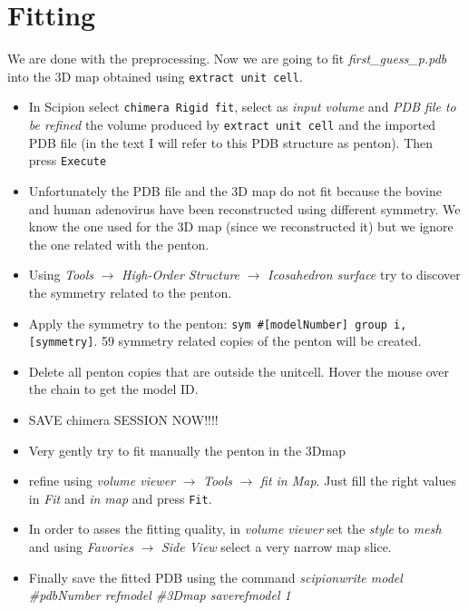 \documentclass[12pt]{article} %
\newcommand{\ttt}[1]{\texttt{#1}}
\begin{document}
\section{Fitting}
We are done with the preprocessing. Now we are going to fit \textit{first\_guess\_p.pdb} into the 3D map obtained using \ttt{extract unit cell}. 

\begin{itemize}
\item In Scipion select \ttt{chimera Rigid fit}, select as \textit{input volume} and \textit{PDB file to be refined} the volume produced by \ttt{extract unit cell} and the imported PDB file (in the text I will refer to this PDB structure as penton). Then press \ttt{Execute}

\item Unfortunately the PDB file and the 3D map do not fit because the bovine and human adenovirus have been reconstructed using different symmetry. We know the one used for
the 3D map (since we reconstructed it) but we ignore the one related with the penton.

\item Using \textit{Tools} $\rightarrow$ \textit{High-Order Structure} $\rightarrow$ \textit{Icosahedron surface} try to discover the symmetry related to the penton.

\item Apply the symmetry to the penton: \ttt{sym \#[modelNumber] group i,[symmetry]}. 59 symmetry related copies of the penton will be created.

\item Delete all penton copies that are outside the unitcell. Hover the mouse over the chain to get the model ID.

\item SAVE chimera SESSION NOW!!!!

\item Very gently try to fit manually the penton in the 3Dmap

\item refine using \textit{volume viewer} $\rightarrow$ \textit{Tools}
$\rightarrow$ \textit{fit in Map}. Just fill the right values in \textit{Fit} and \textit{in map} and press \ttt{Fit}.

\item In order to asses the fitting quality, in \textit{volume viewer} set the \textit{style} to \textit{mesh} and using \textit{Favories} $\rightarrow$ \textit{Side View} select a very narrow map slice.

\item Finally save the fitted PDB using the command \textit{scipionwrite model \#{pdbNumber} refmodel \#{3Dmap} saverefmodel 1}

\end{itemize}
\end{document}
